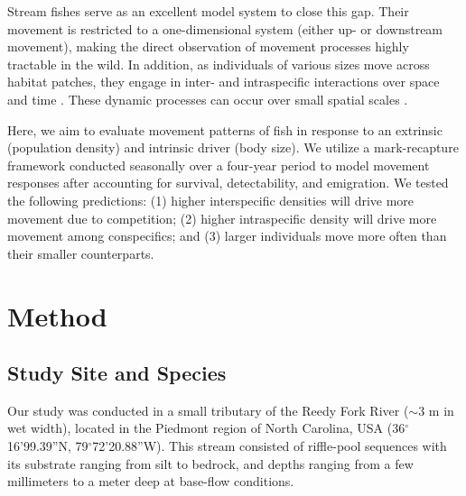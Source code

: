 \documentclass[11pt, class=article, crop=false]{standalone}
\begin{document}
Stream fishes serve as an excellent model system to close this gap. Their movement is restricted to a one-dimensional system (either up- or downstream movement), making the direct observation of movement processes highly tractable in the wild. In addition, as individuals of various sizes move across habitat patches, they engage in inter- and intraspecific interactions over space and time \citep{brownHabitatHeterogeneityActivity2010, davidsonSeasonalSpatialHydrological2012, robinsonEffectsMultiyearExperimental2003, albaneseEcologicalCorrelatesFish2004, nakayamaFinescaleMovementEcology2018, pettyRestrictedMovementMottled2004, robertsSpatiotemporalVariabilityStream2007}. These dynamic processes can occur over small spatial scales \citep{teruiNonrandomDispersalSympatric2021}. 

Here, we aim to evaluate movement patterns of fish in response to an extrinsic (population density) and intrinsic driver (body size). We utilize a mark-recapture framework conducted seasonally over a four-year period to model movement responses after accounting for survival, detectability, and emigration. We tested the following predictions: (1) higher interspecific densities will drive more movement due to competition; (2) higher intraspecific density will drive more movement among conspecifics; and (3) larger individuals move more often than their smaller counterparts.

\section{Method}

\subsection{Study Site and Species}

Our study was conducted in a small tributary of the Reedy Fork River ($\sim$3 m in wet width), located in the Piedmont region of North Carolina, USA (36$^\circ$16’99.39”N, 79$^\circ$72’20.88”W). This stream consisted of riffle-pool sequences with its substrate ranging from silt to bedrock, and depths ranging from a few millimeters to a meter deep at base-flow conditions. 
\end{document}
